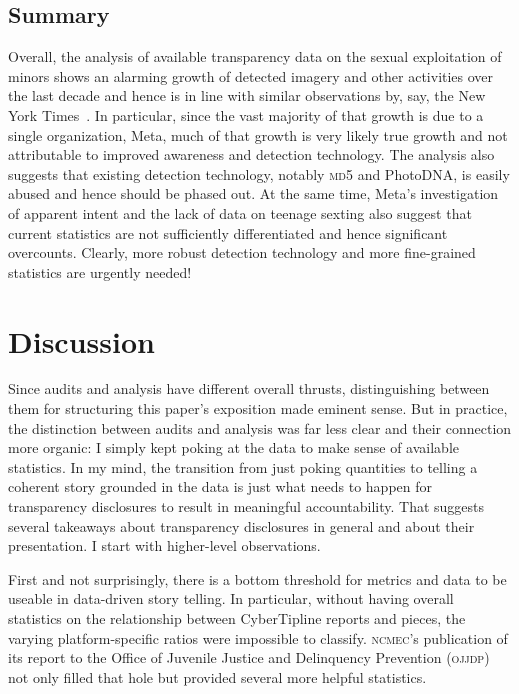 \documentclass[nonacm,screen]{acmart}
\newcommand\V[1]{\textsc{\MakeLowercase{#1}}}
\begin{document}
\subsection{Summary}

Overall, the analysis of available transparency data on the sexual exploitation
of minors shows an alarming growth of detected imagery and other activities over
the last decade and hence is in line with similar observations by, say, the New
York Times~\cite{Dance2019,KellerDance2019}. In particular, since the vast
majority of that growth is due to a single organization, Meta, much of that
growth is very likely true growth and not attributable to improved awareness and
detection technology. The analysis also suggests that existing detection
technology, notably \V{\V{MD5}} and PhotoDNA, is easily abused and hence should
be phased out. At the same time, Meta's investigation of apparent intent and the
lack of data on teenage sexting also suggest that current statistics are not
sufficiently differentiated and hence significant overcounts. Clearly, more
robust detection technology and more fine-grained statistics are urgently
needed!



\section{Discussion}
\label{sec:discussion}

Since audits and analysis have different overall thrusts, distinguishing between
them for structuring this paper's exposition made eminent sense. But in
practice, the distinction between audits and analysis was far less clear and
their connection more organic: I simply kept poking at the data to make sense of
available statistics. In my mind, the transition from just poking quantities to
telling a coherent story grounded in the data is just what needs to happen for
transparency disclosures to result in meaningful accountability. That suggests
several takeaways about transparency disclosures in general and about their
presentation. I start with higher-level observations.

First and not surprisingly, there is a bottom threshold for metrics and data to
be useable in data-driven story telling. In particular, without having overall
statistics on the relationship between CyberTipline reports and pieces, the
varying platform-specific ratios were impossible to classify. \V{NCMEC}'s
publication of its report to the Office of Juvenile Justice and Delinquency
Prevention (\V{OJJDP}) not only filled that hole but provided several more
helpful statistics.
\end{document}

